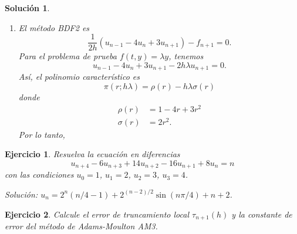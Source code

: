 \documentclass[11pt]{article}
\newtheorem{exercise}{Ejercicio}
\newtheorem*{sol}{Solución}
\begin{document}
\begin{sol}
\begin{enumerate}
      
    \item
      El método BDF2 es
      \begin{equation}
        \frac{1}{2h}(u_{n-1} - 4 u_n + 3 u_{n+1}) - f_{n+1} = 0
      .\end{equation}
      Para el problema de prueba $f(t,y)=\lambda y$, tenemos
      \begin{equation}
        u_{n-1} - 4 u_n + 3 u_{n+1} - 2h\lambda u_{n+1} = 0
      .\end{equation}
      Así, el polinomio característico es
      \begin{equation}
        \pi(r;h\lambda) = \rho(r) - h\lambda \sigma(r)
      \end{equation}
      donde
      \begin{align}
        \rho(r) &= 1 - 4 r + 3 r^{2} \\
        \sigma(r) &= 2r^{2}
      .\end{align}
      Por lo tanto,
      
  \end{enumerate}
    
\end{sol}

\begin{exercise}
  Resuelva la ecuación en diferencias
  \begin{equation}
    u_{n+4} - 6u_{n+3} + 14u_{n+2} - 16 u_{n+1} + 8u_{n} = n
  \end{equation}
  con las condiciones $u_0=1$, $u_1=2$, $u_2=3$, $u_3=4$.

  \emph{Solución: $u_n=2^n(n / 4 -1) + 2^{(n-2) / 2}\sin(n\pi /
  4)+n+2$}.
\end{exercise}

\begin{exercise}
  Calcule el error de truncamiento local $\tau_{n+1}(h)$ y la
  constante de error del método de Adams-Moulton AM3.
\end{exercise}
\end{document}
